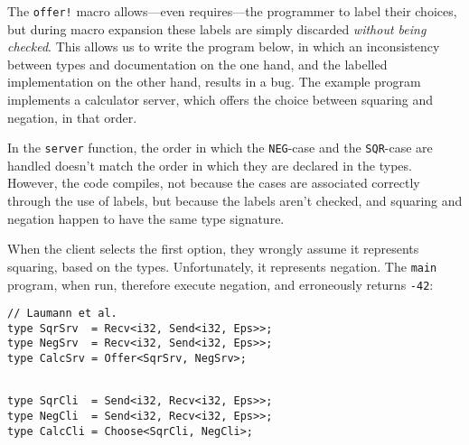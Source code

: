 \documentclass[copyright,creativecommons]{eptcs}
\begin{document}
The \lstinline{offer!} macro allows---even requires---the programmer to label their choices, but during macro expansion these labels are simply discarded \emph{without being checked}. This allows us to write the program below, in which an inconsistency between types and documentation on the one hand, and the labelled implementation on the other hand, results in a bug. The example program implements a calculator server, which offers the choice between squaring and negation, in that order.

In the \lstinline{server} function, the order in which the \lstinline{NEG}-case and the \lstinline{SQR}-case are handled doesn't match the order in which they are declared in the types. However, the code compiles, not because the cases are associated correctly through the use of labels, but because the labels aren't checked, and squaring and negation happen to have the same type signature.

When the client selects the first option, they wrongly assume it represents squaring, based on the types. Unfortunately, it represents negation. The \lstinline{main} program, when run, therefore execute negation, and erroneously returns \lstinline{-42}:

\vspace{-0.5\baselineskip}
\begin{minipage}[t]{0.5\linewidth}
\begin{lstlisting}
// Laumann et al.
type SqrSrv  = Recv<i32, Send<i32, Eps>>;
type NegSrv  = Recv<i32, Send<i32, Eps>>;
type CalcSrv = Offer<SqrSrv, NegSrv>;
\end{lstlisting}
\end{minipage}%
\begin{minipage}[t]{0.5\linewidth}
\begin{lstlisting}

type SqrCli  = Send<i32, Recv<i32, Eps>>;
type NegCli  = Send<i32, Recv<i32, Eps>>;
type CalcCli = Choose<SqrCli, NegCli>;
\end{lstlisting}
\end{minipage}
\vspace{-0.25\baselineskip}
\end{document}
